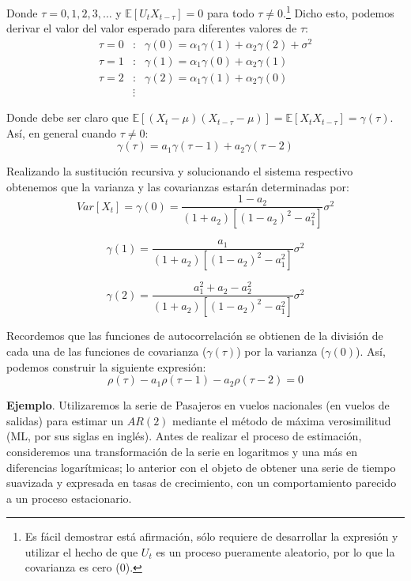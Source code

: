 \documentclass[
]{book}
\begin{document}
Donde \(\tau = 0, 1, 2, 3, \ldots\) y \(\mathbb{E}[U_{t} X_{t - \tau}] = 0\) para todo \(\tau \neq 0\).\footnote{ Es fácil demostrar está afirmación, sólo requiere de desarrollar la expresión y utilizar el hecho de que $U_t$ es un proceso pueramente aleatorio, por lo que la covarianza es cero (0).} Dicho esto, podemos derivar el valor del valor esperado para diferentes valores de \(\tau\):
\begin{eqnarray*}
    \tau = 0 & : & \gamma(0) = \alpha_1 \gamma(1) + \alpha_2 \gamma(2) + \sigma^2 \\
    \tau = 1 & : & \gamma(1) = \alpha_1 \gamma(0) + \alpha_2 \gamma(1) \\
    \tau = 2 & : & \gamma(2) = \alpha_1 \gamma(1) + \alpha_2 \gamma(0) \\
    & \vdots & 
\end{eqnarray*}

Donde debe ser claro que \(\mathbb{E}[(X_{t} - \mu)(X_{t - \tau} - \mu)] = \mathbb{E}[X_{t} X_{t - \tau}] = \gamma(\tau)\). Así, en general cuando \(\tau \neq 0\):
\begin{equation}    
    \gamma(\tau) = a_1 \gamma(\tau - 1) + a_2 \gamma(\tau - 2)
\end{equation}

Realizando la sustitución recursiva y solucionando el sistema respectivo obtenemos que la varianza y las covarianzas estarán determinadas por:
\begin{equation}
    Var[X_t] = \gamma(0) = \frac{1 - a_2}{(1 + a_2)[(1 - a_2)^2 - a^2_1]} \sigma^2
\end{equation}

\begin{equation}
    \gamma(1) = \frac{a_1}{(1 + a_2)[(1 - a_2)^2 - a^2_1]} \sigma^2
\end{equation}

\begin{equation}
    \gamma(2) = \frac{a^2_1 + a_2 - a^2_2}{(1 + a_2)[(1 - a_2)^2 - a^2_1]} \sigma^2
\end{equation}

Recordemos que las funciones de autocorrelación se obtienen de la división de cada una de las funciones de covarianza (\(\gamma(\tau)\)) por la varianza (\(\gamma(0)\)). Así, podemos construir la siguiente expresión:
\begin{equation}
    \rho(\tau) - a_1 \rho(\tau - 1) - a_2 \rho(\tau - 2) = 0
\end{equation}

\textbf{Ejemplo}. Utilizaremos la serie de Pasajeros en vuelos nacionales (en vuelos de salidas) para estimar un \(AR(2)\) mediante el método de máxima verosimilitud (ML, por sus siglas en inglés). Antes de realizar el proceso de estimación, consideremos una transformación de la serie en logaritmos y una más en diferencias logarítmicas; lo anterior con el objeto de obtener una serie de tiempo suavizada y expresada en tasas de crecimiento, con un comportamiento parecido a un proceso estacionario.
\end{document}
